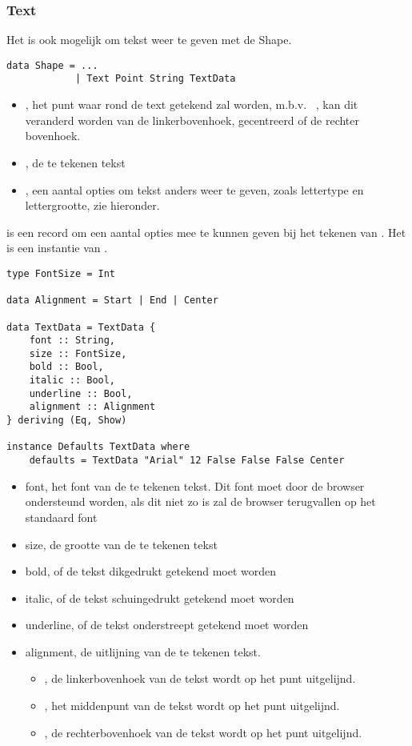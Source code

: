 \subsubsection{Text}
Het is ook mogelijk om tekst weer te geven met de  Shape.
\begin{lstlisting}
data Shape = ...
			| Text Point String TextData
\end{lstlisting} 
\begin{itemize}
	\item {}, het punt waar rond de text getekend zal worden, m.b.v. ~, kan dit veranderd worden van de linkerbovenhoek, gecentreerd of de rechter bovenhoek.
	\item {}, de te tekenen tekst
	\item {}, een aantal opties om tekst anders weer te geven, zoals lettertype en lettergrootte, zie hieronder.
\end{itemize}

 is een record om een aantal opties mee te kunnen geven bij het tekenen van . Het is een instantie van .
\begin{lstlisting}
type FontSize = Int

data Alignment = Start | End | Center

data TextData = TextData {
    font :: String,
    size :: FontSize,
    bold :: Bool,
    italic :: Bool,
    underline :: Bool,
    alignment :: Alignment
} deriving (Eq, Show)

instance Defaults TextData where
    defaults = TextData "Arial" 12 False False False Center
\end{lstlisting}
\begin{itemize}
	\item font, het font van de te tekenen tekst. Dit font moet door de browser ondersteund worden, als dit niet zo is zal de browser terugvallen op het standaard font
	\item size, de grootte van de te tekenen tekst
	\item bold, of de tekst dikgedrukt getekend moet worden
	\item italic, of de tekst schuingedrukt getekend moet worden
	\item underline, of de tekst onderstreept getekend moet worden
	\item alignment, de uitlijning van de te tekenen tekst. 
		\begin{itemize}
			\item {}, de linkerbovenhoek van de tekst wordt op het punt uitgelijnd.
			\item {}, het middenpunt van de tekst wordt op het punt uitgelijnd.
			\item {}, de rechterbovenhoek van de tekst wordt op het punt uitgelijnd.
		\end{itemize}
\end{itemize}

